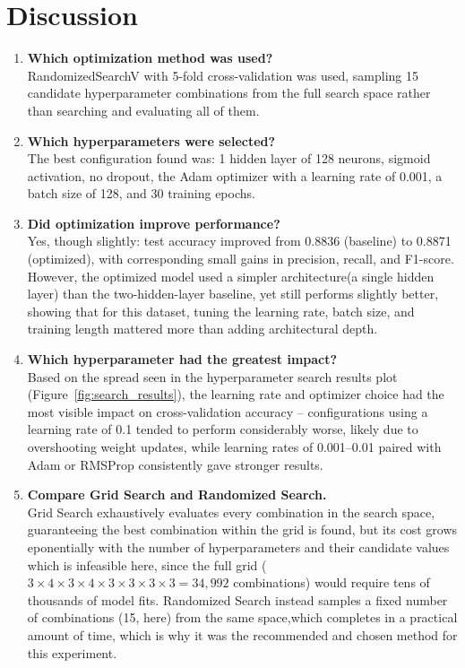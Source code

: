 \documentclass[11pt]{article}
\begin{document}
\section{Discussion}

\begin{enumerate}[label=\arabic*.]

\item \textbf{Which optimization method was used?}\\
RandomizedSearchV with 5-fold cross-validation was used, sampling 15
candidate hyperparameter combinations from the full search space rather than
searching and evaluating all of them.

\item \textbf{Which hyperparameters were selected?}\\
The best configuration found was: 1 hidden layer of 128 neurons, sigmoid
activation, no dropout, the Adam optimizer with a learning rate of 0.001,
a batch size of 128, and 30 training epochs.

\item \textbf{Did optimization improve performance?}\\
Yes, though slightly: test accuracy improved from 0.8836 (baseline) to 0.8871
(optimized), with corresponding small gains in precision, recall, and
F1-score. However, the optimized model used a simpler architecture(a single hidden layer) than the two-hidden-layer baseline, yet still performs
slightly better, showing that for this dataset, tuning the learning rate,
batch size, and training length mattered more than adding architectural depth.

\item \textbf{Which hyperparameter had the greatest impact?}\\
Based on the spread seen in the hyperparameter search results plot
(Figure~\ref{fig:search_results}), the learning rate and optimizer choice had
the most visible impact on cross-validation accuracy -- configurations using a
learning rate of 0.1 tended to perform considerably worse, likely due to
overshooting weight updates, while learning rates of 0.001--0.01
paired with Adam or RMSProp consistently gave stronger results.

\item \textbf{Compare Grid Search and Randomized Search.}\\
Grid Search exhaustively evaluates every combination in the search space,
guaranteeing the best combination within the grid is found, but its
cost grows eponentially with the number of hyperparameters and their
candidate values which is infeasible here, since the full grid
($3\times4\times3\times4\times3\times3\times3\times3 = 34{,}992$ combinations)
would require tens of thousands of model fits. Randomized Search instead
samples a fixed number of combinations (15, here) from the same space,which completes in a
practical amount of time, which is why it was the recommended and chosen
method for this experiment.


\end{enumerate}
\end{document}
